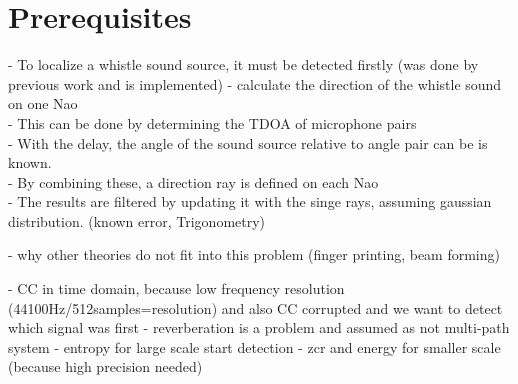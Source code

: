 \chapter{Prerequisites}

- To localize a whistle sound source, it must be detected firstly (was done by previous work
and is implemented)
- calculate the direction of the whistle sound on one Nao\\
- This can be done by determining the \ac{TDOA} of microphone pairs\\
- With the delay, the angle of the sound source relative to angle pair
can be is known.\\
- By combining these, a direction ray is defined on each Nao\\
- The results are filtered by updating it with the singe rays, assuming
gaussian distribution. (known error, Trigonometry)

- why other theories do not fit into this problem
(finger printing, beam forming)

- CC in time domain, because low frequency resolution (44100Hz/512samples=resolution)
and also \ac{CC} corrupted and we want to detect which signal was first
- reverberation is a problem and assumed as not multi-path system
- entropy for large scale start detection
- zcr and energy for smaller scale (because high precision needed)







%
%


%
